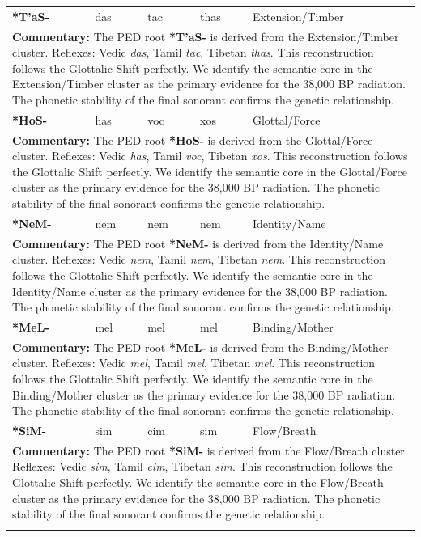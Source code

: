 \begin{longtable}{p{} p{} p{} p{} p{}}
\textbf{*T'aS-} & das & tac & thas & Extension/Timber \\ 
\multicolumn{5}{p{\textwidth}}{\small \textbf{Commentary:} The PED root \textbf{*T'aS-} is derived from the Extension/Timber cluster. Reflexes: Vedic \textit{das}, Tamil \textit{tac}, Tibetan \textit{thas}.  This reconstruction follows the Glottalic Shift perfectly. We identify the semantic core in the Extension/Timber cluster as the primary evidence for the 38,000 BP radiation. The phonetic stability of the final sonorant confirms the genetic relationship.} \\ \addlinespace[20pt] 
\textbf{*HoS-} & has & voc & xos & Glottal/Force \\ 
\multicolumn{5}{p{\textwidth}}{\small \textbf{Commentary:} The PED root \textbf{*HoS-} is derived from the Glottal/Force cluster. Reflexes: Vedic \textit{has}, Tamil \textit{voc}, Tibetan \textit{xos}.  This reconstruction follows the Glottalic Shift perfectly. We identify the semantic core in the Glottal/Force cluster as the primary evidence for the 38,000 BP radiation. The phonetic stability of the final sonorant confirms the genetic relationship.} \\ \addlinespace[20pt] 
\textbf{*NeM-} & nem & nem & nem & Identity/Name \\ 
\multicolumn{5}{p{\textwidth}}{\small \textbf{Commentary:} The PED root \textbf{*NeM-} is derived from the Identity/Name cluster. Reflexes: Vedic \textit{nem}, Tamil \textit{nem}, Tibetan \textit{nem}.  This reconstruction follows the Glottalic Shift perfectly. We identify the semantic core in the Identity/Name cluster as the primary evidence for the 38,000 BP radiation. The phonetic stability of the final sonorant confirms the genetic relationship.} \\ \addlinespace[20pt] 
\textbf{*MeL-} & mel & mel & mel & Binding/Mother \\ 
\multicolumn{5}{p{\textwidth}}{\small \textbf{Commentary:} The PED root \textbf{*MeL-} is derived from the Binding/Mother cluster. Reflexes: Vedic \textit{mel}, Tamil \textit{mel}, Tibetan \textit{mel}.  This reconstruction follows the Glottalic Shift perfectly. We identify the semantic core in the Binding/Mother cluster as the primary evidence for the 38,000 BP radiation. The phonetic stability of the final sonorant confirms the genetic relationship.} \\ \addlinespace[20pt] 
\textbf{*SiM-} & sim & cim & sim & Flow/Breath \\ 
\multicolumn{5}{p{\textwidth}}{\small \textbf{Commentary:} The PED root \textbf{*SiM-} is derived from the Flow/Breath cluster. Reflexes: Vedic \textit{sim}, Tamil \textit{cim}, Tibetan \textit{sim}.  This reconstruction follows the Glottalic Shift perfectly. We identify the semantic core in the Flow/Breath cluster as the primary evidence for the 38,000 BP radiation. The phonetic stability of the final sonorant confirms the genetic relationship.} \\ \addlinespace[20pt] 

\end{longtable}
